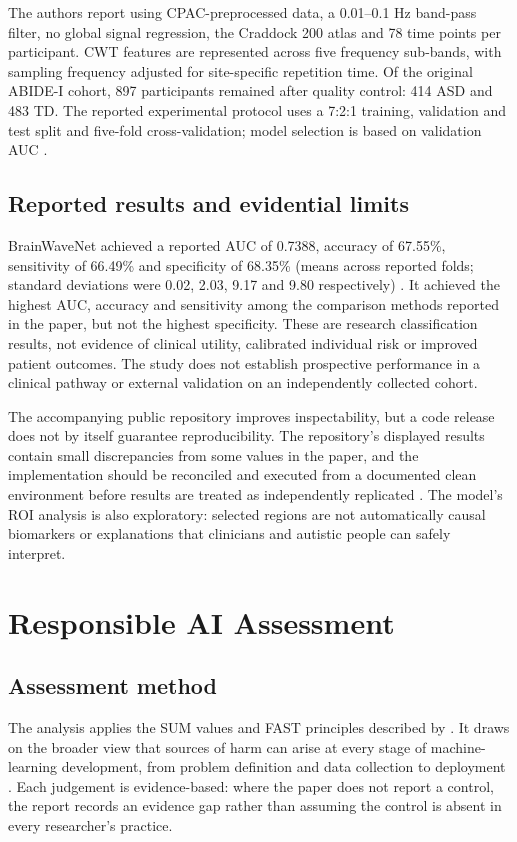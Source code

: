 \documentclass[11pt,a4paper]{article}
\begin{document}
The authors report using CPAC-preprocessed data, a 0.01--0.1 Hz band-pass filter, no global signal regression, the Craddock 200 atlas and 78 time points per participant. CWT features are represented across five frequency sub-bands, with sampling frequency adjusted for site-specific repetition time. Of the original ABIDE-I cohort, 897 participants remained after quality control: 414 ASD and 483 TD. The reported experimental protocol uses a 7:2:1 training, validation and test split and five-fold cross-validation; model selection is based on validation AUC \parencite{jeong2024}.

\subsection{Reported results and evidential limits}
BrainWaveNet achieved a reported AUC of 0.7388, accuracy of 67.55\%, sensitivity of 66.49\% and specificity of 68.35\% (means across reported folds; standard deviations were 0.02, 2.03, 9.17 and 9.80 respectively) \parencite{jeong2024}. It achieved the highest AUC, accuracy and sensitivity among the comparison methods reported in the paper, but not the highest specificity. These are research classification results, not evidence of clinical utility, calibrated individual risk or improved patient outcomes. The study does not establish prospective performance in a clinical pathway or external validation on an independently collected cohort.

The accompanying public repository improves inspectability, but a code release does not by itself guarantee reproducibility. The repository's displayed results contain small discrepancies from some values in the paper, and the implementation should be reconciled and executed from a documented clean environment before results are treated as independently replicated \parencite{brainwavenetcode}. The model's ROI analysis is also exploratory: selected regions are not automatically causal biomarkers or explanations that clinicians and autistic people can safely interpret.

\section{Responsible AI Assessment}
\subsection{Assessment method}
The analysis applies the SUM values and FAST principles described by \textcite{leslie2019}. It draws on the broader view that sources of harm can arise at every stage of machine-learning development, from problem definition and data collection to deployment \parencite{suresh2021}. Each judgement is evidence-based: where the paper does not report a control, the report records an evidence gap rather than assuming the control is absent in every researcher's practice.
\end{document}
